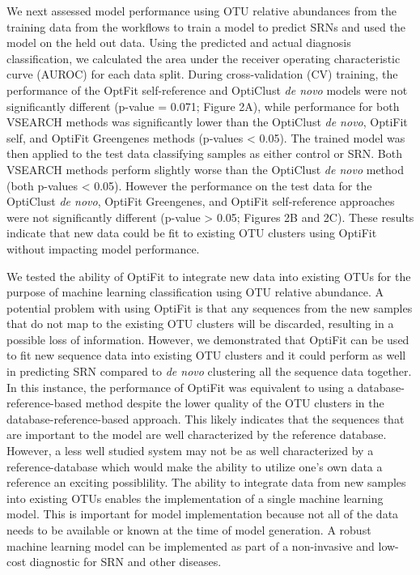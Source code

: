 \documentclass[
]{article}
\begin{document}
We next assessed model performance using OTU relative abundances from
the training data from the workflows to train a model to predict SRNs
and used the model on the held out data. Using the predicted and actual
diagnosis classification, we calculated the area under the receiver
operating characteristic curve (AUROC) for each data split. During
cross-validation (CV) training, the performance of the OptFit
self-reference and OptiClust \emph{de novo} models were not
significantly different (p-value = 0.071; Figure 2A), while performance
for both VSEARCH methods was significantly lower than the OptiClust
\emph{de novo}, OptiFit self, and OptiFit Greengenes methods (p-values
\textless{} 0.05). The trained model was then applied to the test data
classifying samples as either control or SRN. Both VSEARCH methods
perform slightly worse than the OptiClust \emph{de novo} method (both
p-values \textless{} 0.05). However the performance on the test data for
the OptiClust \emph{de novo}, OptiFit Greengenes, and OptiFit
self-reference approaches were not significantly different (p-value
\textgreater{} 0.05; Figures 2B and 2C). These results indicate that new
data could be fit to existing OTU clusters using OptiFit without
impacting model performance.

We tested the ability of OptiFit to integrate new data into existing
OTUs for the purpose of machine learning classification using OTU
relative abundance. A potential problem with using OptiFit is that any
sequences from the new samples that do not map to the existing OTU
clusters will be discarded, resulting in a possible loss of information.
However, we demonstrated that OptiFit can be used to fit new sequence
data into existing OTU clusters and it could perform as well in
predicting SRN compared to \emph{de novo} clustering all the sequence
data together. In this instance, the performance of OptiFit was
equivalent to using a database-reference-based method despite the lower
quality of the OTU clusters in the database-reference-based approach.
This likely indicates that the sequences that are important to the model
are well characterized by the reference database. However, a less well
studied system may not be as well characterized by a reference-database
which would make the ability to utilize one's own data a reference an
exciting possiblility. The ability to integrate data from new samples
into existing OTUs enables the implementation of a single machine
learning model. This is important for model implementation because not
all of the data needs to be available or known at the time of model
generation. A robust machine learning model can be implemented as part
of a non-invasive and low-cost diagnostic for SRN and other diseases.
\end{document}

